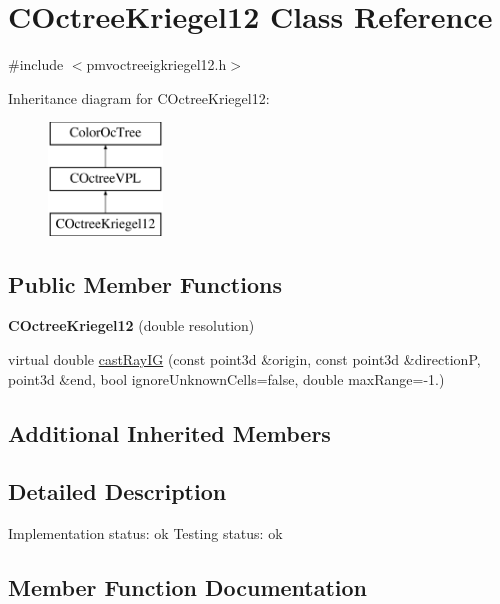 \hypertarget{classCOctreeKriegel12}{}\section{C\+Octree\+Kriegel12 Class Reference}
\label{classCOctreeKriegel12}


{\ttfamily \#include $<$pmvoctreeigkriegel12.\+h$>$}

Inheritance diagram for C\+Octree\+Kriegel12\+:\begin{figure}[H]
\begin{center}
\leavevmode
\includegraphics[height=3.000000cm]{classCOctreeKriegel12}
\end{center}
\end{figure}
\subsection*{Public Member Functions}
\begin{DoxyCompactItemize}
\item 
{\bfseries C\+Octree\+Kriegel12} (double resolution)\hypertarget{classCOctreeKriegel12_a5869334baea8686aff6f87df14676d07}{}\label{classCOctreeKriegel12_a5869334baea8686aff6f87df14676d07}

\item 
virtual double \hyperlink{classCOctreeKriegel12_aa900e135c79350675fb0b6a9ab5e3c02}{cast\+Ray\+IG} (const point3d \&origin, const point3d \&directionP, point3d \&end, bool ignore\+Unknown\+Cells=false, double max\+Range=-\/1.)
\end{DoxyCompactItemize}
\subsection*{Additional Inherited Members}


\subsection{Detailed Description}
Implementation status\+: ok Testing status\+: ok 

\subsection{Member Function Documentation}
